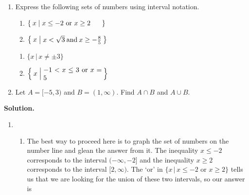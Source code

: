 \begin{ex} \label{intervalex} $~$

\begin{enumerate} \item Express the following sets of numbers using interval notation.

\begin{multicols}{2}

\begin{enumerate}

\item  $\Set{ x | \parbox{0.25\textwidth}{$x \leq -2$ or $x \geq 2$} }$

\item  $\Set{ x | \parbox{0.25\textwidth}{$x < \sqrt{3}$ and $x \geq -\frac{8}{5}$} }$

\setcounter{HW}{\value{enumii}}

\end{enumerate}

\end{multicols}

\begin{multicols}{2}

\begin{enumerate}

\setcounter{enumii}{\value{HW}}

\item  $\{ x \, | \, x \neq \pm 3 \}$

\item  $\Set{ x | \parbox{0.25\textwidth}{$-1 < x \leq 3$ or $x = 5$}}$

\end{enumerate}

\end{multicols}

\item  Let $A = [-5,3)$ and $B = (1, \infty)$.  Find  $A \cap B$ and $A\cup B$. 

\end{enumerate}


{\bf Solution.}

\begin{enumerate}

\item 

\begin{enumerate}

\item  The best way to proceed here is to graph the set of numbers on the number line and glean the answer from it.  The inequality $x \leq -2$ corresponds to the interval $(-\infty, -2]$ and the inequality $x \geq 2$ corresponds to the interval $[2, \infty)$. The `or' in $\{ x \, | \, x \leq -2 \, \, \text{or} \, \,  x \geq 2 \}$ tells us that we are looking for the union of these two intervals, so our answer is


\end{enumerate}
\end{enumerate}
\end{ex}
